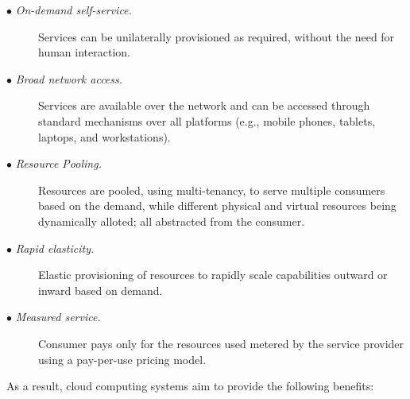 \begin{description}
	\item[$\bullet$ \it On-demand self-service.]
	\hfill\break
	Services can be unilaterally provisioned as required, without the need for human interaction.
	
	\item[$\bullet$ \it Broad network access.]
	\hfill\break
	Services are available over the network and can be accessed through standard mechanisms over all platforms (e.g., mobile phones, tablets, laptops, and workstations).
	
	\item[$\bullet$ \it Resource Pooling.]
	\hfill\break
	Resources are pooled, using multi-tenancy, to serve multiple consumers based on the demand, while different physical and virtual resources being dynamically alloted; all abstracted from the consumer.

	\item[$\bullet$ \it Rapid elasticity.]
	\hfill\break
	Elastic provisioning of resources to rapidly scale capabilities outward or inward based on demand.
	
	\item[$\bullet$ \it Measured service.]
	\hfill\break
	Consumer pays only for the resources used metered by the service provider using a pay-per-use pricing model.
\end{description}

As a result, cloud computing systems aim to provide the following benefits:

